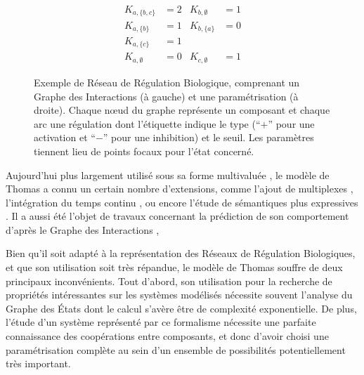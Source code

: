 \begin{figure}[ht]
\begin{minipage}{0.4\linewidth}
\centering
{}
\end{minipage}
\begin{minipage}{0.6\linewidth}
\centering
\begin{align*}
K_{a,\{b,c\}} &= 2 & K_{b,\emptyset} &= 1 \\
K_{a,\{b\}} &= 1 & K_{b,\{a\}} &= 0 \\
K_{a,\{c\}} &= 1 &&\\
K_{a,\emptyset} &= 0 & K_{c,\emptyset} &= 1
\end{align*}
\end{minipage}
\caption{\label{fig:exRRB}
Exemple de Réseau de Régulation Biologique, comprenant un Graphe des Interactions (à gauche) et une paramétrisation (à droite).
Chaque nœud du graphe représente un composant et chaque arc une régulation
dont l'étiquette indique le type (“$+$” pour une activation et “$-$” pour une inhibition) et le seuil.
Les paramètres tiennent lieu de points focaux pour l'état concerné.
}
\end{figure}

Aujourd'hui plus largement utilisé sous sa forme multivaluée \cite{richard-comet-bernot-08}, le modèle de Thomas a connu un certain nombre d'extensions,
comme l'ajout de multiplexes \cite{bernot-comet-khalis-08},
l'intégration du temps continu \cite{Ahmad08},
ou encore l'étude de sémantiques plus expressives \cite{BernotSemBRN}.
Il a aussi été l'objet de travaux concernant la prédiction de son comportement d'après le Graphe des Interactions \cite{RiCo07},

Bien qu'il soit adapté à la représentation des Réseaux de Régulation Biologiques, et que son utilisation soit très répandue, le modèle de Thomas souffre de deux principaux inconvénients.
Tout d'abord, son utilisation pour la recherche de propriétés intéressantes sur les systèmes modélisés nécessite souvent l'analyse du Graphe des États dont le calcul s'avère être de complexité exponentielle.
De plus, l'étude d'un système représenté par ce formalisme nécessite une parfaite connaissance des coopérations entre composants, et donc d'avoir choisi une paramétrisation complète au sein d'un ensemble de possibilités potentiellement très important.



